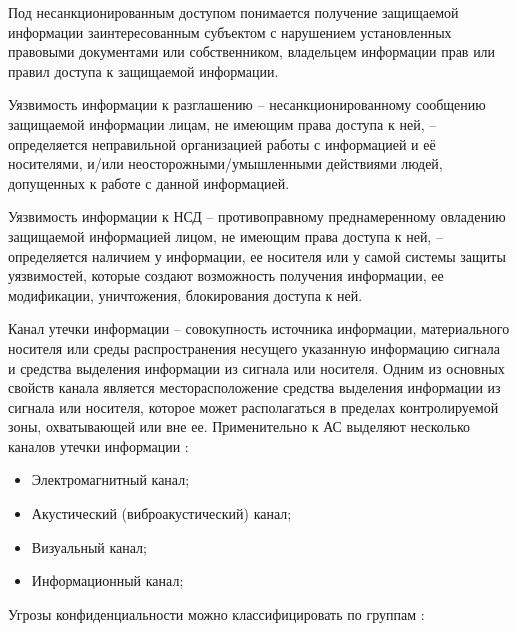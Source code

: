 Под несанкционированным доступом понимается получение защищаемой информации
заинтересованным субъектом с нарушением установленных правовыми документами или собственником, владельцем информации прав
или правил доступа к защищаемой информации.


Уязвимость информации к разглашению – несанкционированному сообщению защищаемой информации лицам, не имеющим
права доступа к ней, – определяется неправильной организацией работы с информацией и её
носителями, и/или неосторожными/умышленными действиями людей, допущенных к работе с данной информацией.

Уязвимость информации к НСД – противоправному преднамеренному овладению защищаемой информацией лицом,
не имеющим права доступа к ней, – определяется наличием у информации, ее носителя или у самой системы
защиты уязвимостей, которые создают возможность получения информации, ее модификации, уничтожения,
блокирования доступа к ней.

Канал утечки информации – совокупность источника информации, материального носителя или среды распространения
несущего указанную информацию сигнала и средства выделения информации из сигнала или носителя.
Одним из основных свойств канала является месторасположение средства выделения информации из сигнала или носителя,
которое может располагаться в пределах контролируемой зоны, охватывающей или вне ее. Применительно к АС выделяют
несколько каналов утечки информации \cite{GOST50922}:

\begin{itemize}
    \item Электромагнитный канал;
    \item Акустический (виброакустический) канал;
    \item Визуальный канал;
    \item Информационный канал;
\end{itemize}


Угрозы конфиденциальности можно классифицировать по группам \cite{RT-SOLAR-conf}:

